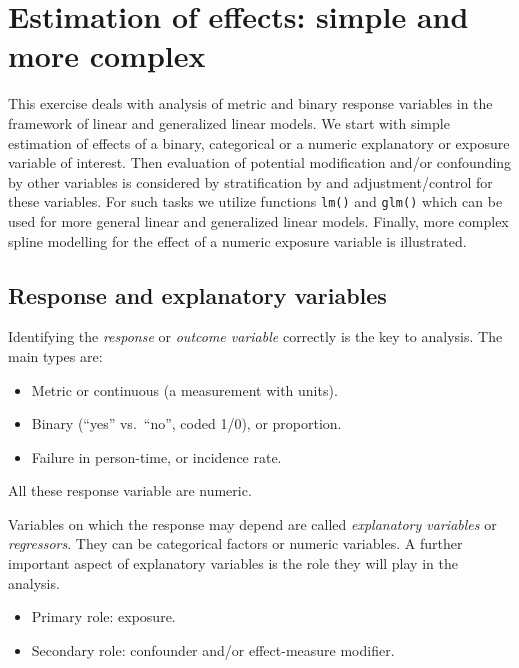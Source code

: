 \documentclass[
]{book}
\providecommand{\tightlist}{%
  \setlength{\itemsep}{0pt}\setlength{\parskip}{0pt}}
\theoremstyle{definition}
\theoremstyle{definition}
\theoremstyle{definition}
\theoremstyle{definition}
\theoremstyle{remark}
\begin{document}
\chapter{Estimation of effects: simple and more complex}\label{estimation-of-effects-simple-and-more-complex}

This exercise deals with analysis of metric and binary
response variables in the framework of linear and
generalized linear models.
We start with simple estimation of effects of a binary, categorical or
a numeric explanatory or exposure variable of interest.
Then evaluation of potential modification and/or confounding by other variables
is considered by stratification by and adjustment/control for these variables.
For such tasks we utilize functions \texttt{lm()} and \texttt{glm()}
which can be used for more
general linear and generalized linear models. Finally, more complex
spline modelling for the effect of a numeric exposure variable is
illustrated.

\section{Response and explanatory variables}\label{response-and-explanatory-variables}

Identifying the \emph{response} or \emph{outcome variable} correctly is the key
to analysis. The main types are:

\begin{itemize}
\tightlist
\item
  Metric or continuous (a measurement with units).
\item
  Binary (``yes'' vs.~``no'', coded 1/0), or proportion.
\item
  Failure in person-time, or incidence rate.
\end{itemize}

All these response variable are numeric.

Variables on which the response may depend are called \emph{explanatory
variables} or \emph{regressors}. They can be categorical factors or
numeric variables.
A further important aspect of explanatory variables is the role they
will play in the analysis.

\begin{itemize}
\tightlist
\item
  Primary role: exposure.
\item
  Secondary role: confounder and/or effect-measure modifier.
\end{itemize}
\end{document}
